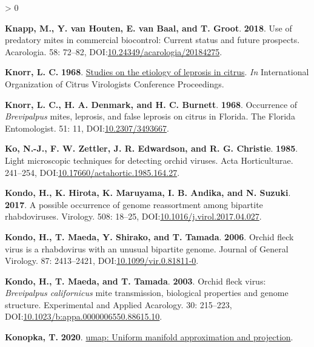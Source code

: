 \documentclass{ufdissertation}[overrideChapters] %
\newlength{\cslhangindent}
\newenvironment{CSLReferences}[2] %
 {%
  \setlength{\parindent}{0pt}
  \ifodd #1 \everypar{\setlength{\hangindent}{\cslhangindent}}\ignorespaces\fi
  \ifnum #2 > 0
  \setlength{\parskip}{#2\baselineskip}
  \fi
 }%
 {}
\begin{document}
{\begin{CSLReferences}{1}{1}
\leavevmode{}%
\textbf{Knapp, M., Y. van Houten, E. van Baal, and T. Groot}. \textbf{2018}. Use of predatory mites in commercial biocontrol: Current status and future prospects. Acarologia. 58: 72--82, DOI:\href{https://doi.org/10.24349/acarologia/20184275}{10.24349/acarologia/20184275}.

\leavevmode{}%
\textbf{Knorr, L. C.} \textbf{1968}. \href{https://doi.org/10.5070/C526w4x67c}{Studies on the etiology of leprosis in citrus}. \emph{In} International Organization of Citrus Virologists Conference Proceedings.

\leavevmode{}%
\textbf{Knorr, L. C., H. A. Denmark, and H. C. Burnett}. \textbf{1968}. Occurrence of {\emph{Brevipalpus}} mites, leprosis, and false leprosis on citrus in {Florida}. The Florida Entomologist. 51: 11, DOI:\href{https://doi.org/10.2307/3493667}{10.2307/3493667}.

\leavevmode{}%
\textbf{Ko, N.-J., F. W. Zettler, J. R. Edwardson, and R. G. Christie}. \textbf{1985}. Light microscopic techniques for detecting orchid viruses. Acta Horticulturae. 241--254, DOI:\href{https://doi.org/10.17660/actahortic.1985.164.27}{10.17660/actahortic.1985.164.27}.

\leavevmode{}%
\textbf{Kondo, H., K. Hirota, K. Maruyama, I. B. Andika, and N. Suzuki}. \textbf{2017}. A possible occurrence of genome reassortment among bipartite rhabdoviruses. Virology. 508: 18--25, DOI:\href{https://doi.org/10.1016/j.virol.2017.04.027}{10.1016/j.virol.2017.04.027}.

\leavevmode{}%
\textbf{Kondo, H., T. Maeda, Y. Shirako, and T. Tamada}. \textbf{2006}. {Orchid fleck virus} is a rhabdovirus with an unusual bipartite genome. Journal of General Virology. 87: 2413--2421, DOI:\href{https://doi.org/10.1099/vir.0.81811-0}{10.1099/vir.0.81811-0}.

\leavevmode{}%
\textbf{Kondo, H., T. Maeda, and T. Tamada}. \textbf{2003}. {Orchid fleck virus}: {\emph{Brevipalpus californicus}} mite transmission, biological properties and genome structure. Experimental and Applied Acarology. 30: 215--223, DOI:\href{https://doi.org/10.1023/b:appa.0000006550.88615.10}{10.1023/b:appa.0000006550.88615.10}.

\leavevmode{}%
\textbf{Konopka, T.} \textbf{2020}. \href{https://CRAN.R-project.org/package=umap}{{umap}: Uniform manifold approximation and projection}.


\end{CSLReferences}}
\end{document}
